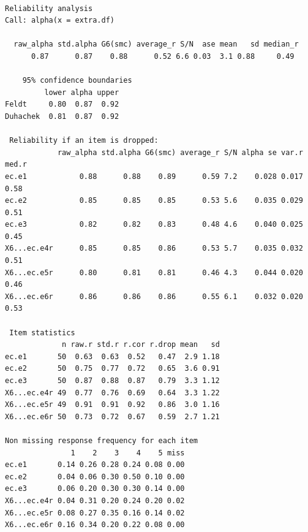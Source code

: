 \documentclass[
  letterpaper,
  DIV=11,
  numbers=noendperiod,
  oneside]{scrreprt}
\begin{document}
\begin{verbatim}

Reliability analysis   
Call: alpha(x = extra.df)

  raw_alpha std.alpha G6(smc) average_r S/N  ase mean   sd median_r
      0.87      0.87    0.88      0.52 6.6 0.03  3.1 0.88     0.49

    95% confidence boundaries 
         lower alpha upper
Feldt     0.80  0.87  0.92
Duhachek  0.81  0.87  0.92

 Reliability if an item is dropped:
            raw_alpha std.alpha G6(smc) average_r S/N alpha se var.r med.r
ec.e1            0.88      0.88    0.89      0.59 7.2    0.028 0.017  0.58
ec.e2            0.85      0.85    0.85      0.53 5.6    0.035 0.029  0.51
ec.e3            0.82      0.82    0.83      0.48 4.6    0.040 0.025  0.45
X6...ec.e4r      0.85      0.85    0.86      0.53 5.7    0.035 0.032  0.51
X6...ec.e5r      0.80      0.81    0.81      0.46 4.3    0.044 0.020  0.46
X6...ec.e6r      0.86      0.86    0.86      0.55 6.1    0.032 0.020  0.53

 Item statistics 
             n raw.r std.r r.cor r.drop mean   sd
ec.e1       50  0.63  0.63  0.52   0.47  2.9 1.18
ec.e2       50  0.75  0.77  0.72   0.65  3.6 0.91
ec.e3       50  0.87  0.88  0.87   0.79  3.3 1.12
X6...ec.e4r 49  0.77  0.76  0.69   0.64  3.3 1.22
X6...ec.e5r 49  0.91  0.91  0.92   0.86  3.0 1.16
X6...ec.e6r 50  0.73  0.72  0.67   0.59  2.7 1.21

Non missing response frequency for each item
               1    2    3    4    5 miss
ec.e1       0.14 0.26 0.28 0.24 0.08 0.00
ec.e2       0.04 0.06 0.30 0.50 0.10 0.00
ec.e3       0.06 0.20 0.30 0.30 0.14 0.00
X6...ec.e4r 0.04 0.31 0.20 0.24 0.20 0.02
X6...ec.e5r 0.08 0.27 0.35 0.16 0.14 0.02
X6...ec.e6r 0.16 0.34 0.20 0.22 0.08 0.00
\end{verbatim}

\end{document}
